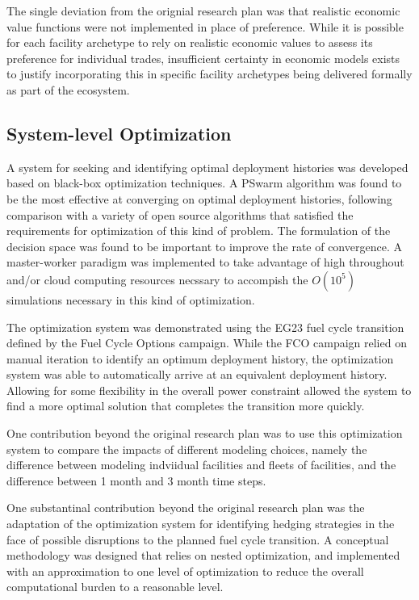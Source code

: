 The single deviation from the orignial research plan was that realistic
economic value functions were not implemented in place of preference.  While
it is possible for each facility archetype to rely on realistic economic
values to assess its preference for individual trades, insufficient certainty
in economic models exists to justify incorporating this in specific facility
archetypes being delivered formally as part of the \Cyclus{} ecosystem.

\subsection{System-level Optimization}

A system for seeking and identifying optimal deployment histories was
developed based on black-box optimization techniques.  A PSwarm algorithm was
found to be the most effective at converging on optimal deployment histories,
following comparison with a variety of open source algorithms that satisfied
the requirements for optimization of this kind of problem.  The formulation of
the decision space was found to be important to improve the rate of
convergence.  A master-worker paradigm was implemented to take advantage of
high throughout and/or cloud computing resources necssary to accompish the
$O(10^5)$ \Cyclus{} simulations necessary in this kind of optimization.

The optimization system was demonstrated using the EG23 fuel cycle transition
defined by the Fuel Cycle Options campaign.  While the FCO campaign relied on
manual iteration to identify an optimum deployment history, the optimization
system was able to automatically arrive at an equivalent deployment history.
Allowing for some flexibility in the overall power constraint allowed the
system to find a more optimal solution that completes the transition more
quickly.

One contribution beyond the original research plan was to use this
optimization system to compare the impacts of different modeling choices,
namely the difference between modeling indviidual facilities and fleets of
facilities, and the difference between 1 month and 3 month time
steps. 

One substantinal contribution beyond the original research plan was the
adaptation of the optimization system for identifying hedging strategies in
the face of possible disruptions to the planned fuel cycle transition.  A
conceptual methodology was designed that relies on nested optimization, and
implemented with an approximation to one level of optimization to reduce the
overall computational burden to a reasonable level.






